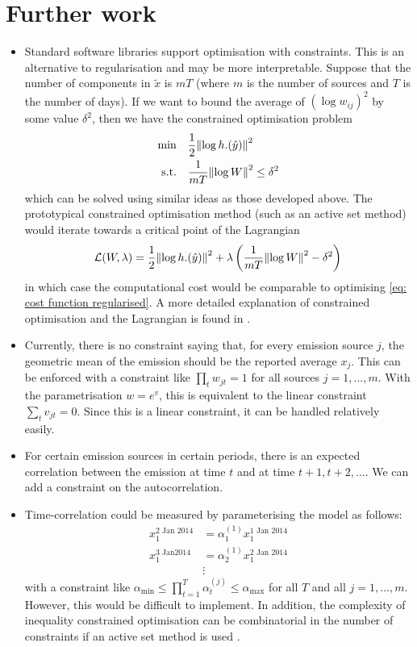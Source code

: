 \documentclass{article}
\begin{document}
\section{Further work}
\label{sec: further work}
\begin{itemize}
    \item Standard software libraries support optimisation with constraints. This is an alternative to regularisation and may be more interpretable.
    Suppose that the number of components in $\tilde{x}$ is $m T$ (where $m$ is the number of sources and $T$ is the number of days).
    If we want to bound the average of $(\log w_{ij})^2$ by some value $\delta^2$, then we have the constrained optimisation problem
    \begin{align*}
        \min\quad & \frac{1}{2} \norm{\log h.(\hat{y})}^2 \\
        \text{s.t.}\quad & \frac{1}{mT} \norm{\log W}^2 \le \delta^2
    \end{align*} 
    which can be solved using similar ideas as those developed above. The prototypical constrained optimisation method (such as an active set method) would iterate towards a critical point of the Lagrangian
    $$
    \mathcal{L}(W, \lambda) = \frac{1}{2} \norm{\log h.(\hat{y})}^2 + \lambda\left(\frac{1}{mT} \norm{\log W}^2 - \delta^2\right)
    $$
    in which case the computational cost would be comparable to optimising \cref{eq: cost function regularised}. A more detailed explanation of constrained optimisation and the Lagrangian is found in \cite{Nocedal2006}.
    \item Currently, there is no constraint saying that, for every emission source $j$, the geometric mean of the emission should be the reported average $x_j$. This can be enforced with a constraint like $\prod_{t} w_{jt} = 1$ for all sources $j=1,\dots,m$. With the parametrisation $w = e^v$, this is equivalent to the linear constraint $\sum_{t} v_{jt} = 0$. Since this is a linear constraint, it can be handled relatively easily.
    \item For certain emission sources in certain periods, there is an expected correlation between the emission at time $t$ and at time $t + 1, t + 2, \dots$. We can add a constraint on the autocorrelation.
    \item Time-correlation could be measured by parameterising the model as follows: 
    \begin{align*}
        x_1^{2 \text{ Jan } 2014} &= \alpha_1^{(1)} x_1^{1 \text{ Jan } 2014} \\
        x_1^{3 \text{ Jan} 2014} &= \alpha_2^{(1)} x_1^{2 \text{ Jan } 2014} \\
        &\vdots
    \end{align*}
    with a constraint like $\alpha_{\min} \le \prod_{t=1}^T \alpha_t^{(j)} \le \alpha_{\max}$ for all $T$ and all $j = 1,\dots,m$. However, this would be difficult to implement. In addition, the complexity of inequality constrained optimisation can be combinatorial in the number of constraints if an active set method is used \cite{Nocedal2006}.


\end{itemize}
\end{document}
